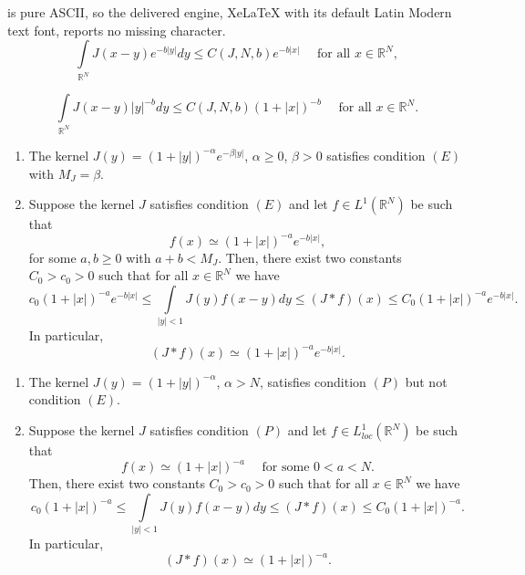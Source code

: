 \documentclass[10pt,a4paper]{amsart}
\newcommand{\R}{\mathbb R}
\newcommand{\intl}{\int\limits}
\begin{document}
is pure ASCII, so the delivered engine, XeLaTeX with its default Latin Modern text font, reports no missing character.
\begin{equation}\label{E}
\intl_{\R^N}J(x-y)e^{-b|y|}dy\leq C(J,N,b) e^{-b|x|}\quad\mbox{ for all }x\in \R^N,
\end{equation}

\begin{equation}\label{P}
\intl_{\R^N}J(x-y)|y|^{-b} dy\leq C(J,N,b) (1+|x|)^{-b}\quad\mbox{ for all }x\in \R^N.
\end{equation}

\begin{lemma}\label{l1}
\begin{enumerate}
\item[\rm (i)] The kernel $J(y)=(1+|y|)^{-\alpha}e^{-\beta|y|}$, $\alpha\geq 0$, $\beta>0$  satisfies condition $(E)$ with $M_J=\beta$.
\item[\rm (ii)] Suppose the kernel $J$ satisfies condition $(E)$ and let $f\in L^1(\R^N)$ be such that 
$$
f(x)\simeq (1+|x|)^{-a}e^{-b |x|},
$$
for some $a,b\geq 0$ with $a+b<M_J$. Then, there exist two constants $C_0>c_0>0$ such that for all $x\in \R^N$ we have 
\begin{equation}\label{kernimp}
c_0 (1+|x|)^{-a}e^{-b |x|} \leq \intl_{|y|<1}  J(y) f(x-y) dy\leq (J*f)(x)\leq C_0 (1+|x|)^{-a}e^{-b |x|}.
\end{equation}
In particular,
\begin{equation}\label{kernj}
(J * f)(x) \simeq (1+|x|)^{-a}e^{-b |x|}.
\end{equation}
\end{enumerate}
\end{lemma}

\begin{lemma}\label{l12}
\begin{enumerate}
\item[\rm (i)] The kernel $J(y)=(1+|y|)^{-\alpha}$, $\alpha>N$, satisfies condition $(P)$ but not condition $(E)$.
\item[\rm (ii)] Suppose the kernel $J$ satisfies condition $(P)$ and let $f\in L^1_{loc}(\R^N)$ be such that 
$$
f(x)\simeq (1+|x|)^{-a} \quad\mbox{ for some }0<a<N.
$$
Then, there exist two constants $C_0>c_0>0$ such that for all $x\in \R^N$ we have 
\begin{equation}\label{kernimp2}
c_0 (1+|x|)^{-a}\leq \intl_{|y|<1} J(y) f(x-y) dy\leq (J*f)(x)\leq C_0 (1+|x|)^{-a}.
\end{equation}
In particular,
\begin{equation}\label{kernj2a}
(J * f)(x) \simeq (1+|x|)^{-a}.
\end{equation}
\end{enumerate}
\end{lemma}
\end{document}
